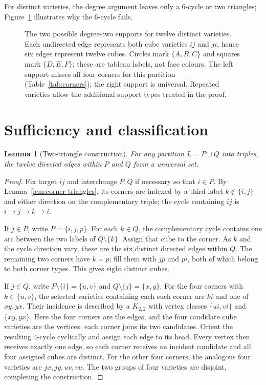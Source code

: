 \documentclass[11pt]{article}
\newtheorem{lemma}[theorem]{Lemma}
\begin{document}
For distinct varieties, the degree argument leaves only a 6-cycle or two
triangles; Figure~\ref{fig:supports} illustrates why the 6-cycle fails.
\begin{figure}[htbp]
\centering

\caption{The two possible degree-two supports for twelve distinct varieties.
Each undirected edge represents both cube varieties $ij$ and $ji$, hence
six edges represent twelve cubes. Circles mark $\{A,B,C\}$ and squares
mark $\{D,E,F\}$; these are tableau labels, not face colours. The left
support misses all four corners for this partition (Table~\ref{tab:corners});
the right support is universal. Repeated varieties allow the additional
support types treated in the proof.}
\label{fig:supports}
\end{figure}

\section{Sufficiency and classification}
\begin{lemma}[Two-triangle construction]
\label{lem:sufficiency}
For any partition $L=P\sqcup Q$ into triples, the twelve directed edges
within $P$ and $Q$ form a universal set.
\end{lemma}
\begin{proof}
Fix target $ij$ and interchange $P,Q$ if necessary so that $i\in P$.
By Lemma~\ref{lem:corner-triangles}, its corners are indexed by a third
label $k\notin\{i,j\}$ and either direction on the complementary triple;
the cycle containing $ij$ is $i\to j\to k\to i$.

If $j\in P$, write $P=\{i,j,p\}$. For each $k\in Q$, the
complementary cycle contains one arc between the two labels of $Q\setminus
\{k\}$. Assign that cube to the corner. As $k$ and the cycle direction vary,
these are the six distinct directed edges within $Q$. The remaining two
corners have $k=p$; fill them with $jp$ and $pi$, both of which belong to
both corner types. This gives eight distinct cubes.

If $j\in Q$, write $P\setminus\{i\}=\{u,v\}$ and
$Q\setminus\{j\}=\{x,y\}$. For the four corners with $k\in\{u,v\}$,
the selected varieties containing each such corner are $ki$ and one of
$xy,yx$. Their incidence
is described by a $K_{2,2}$ with vertex classes $\{ui,vi\}$ and
$\{xy,yx\}$. Here the four corners are the edges, and the four candidate
cube varieties are the vertices: each corner joins its two candidates.
Orient the resulting 4-cycle cyclically and assign each edge to its head.
Every vertex then receives exactly one edge, so each corner receives an
incident candidate and all four assigned cubes are distinct.
For the other four corners, the analogous four varieties are $jx,jy,uv,vu$.
The two groups of four varieties are disjoint, completing the construction.
\end{proof}
\end{document}
